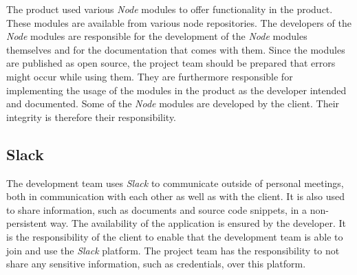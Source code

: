 The product used various \textit{Node} modules to offer functionality in the product. These modules are available from various node repositories.
\newline
The developers of the \textit{Node} modules are responsible for the development of the \textit{Node} modules themselves and for the documentation that comes with them. Since the modules are published as open source, the project team should be prepared that errors might occur while using them. They are furthermore responsible for implementing the usage of the modules in the product as the developer intended and documented.
\newline
Some of the \textit{Node} modules are developed by the client. Their integrity is therefore their responsibility.

\subsection{Slack}

The development team uses \textit{Slack} to communicate outside of personal meetings, both in communication with each other as well as with the client. It is also used to share information, such as documents and source code snippets, in a non-persistent way.
\newline
The availability of the application is ensured by the developer. It is the responsibility of the client to enable that the development team is able to join and use the \textit{Slack} platform. The project team has the responsibility to not share any sensitive information, such as credentials, over this platform.

